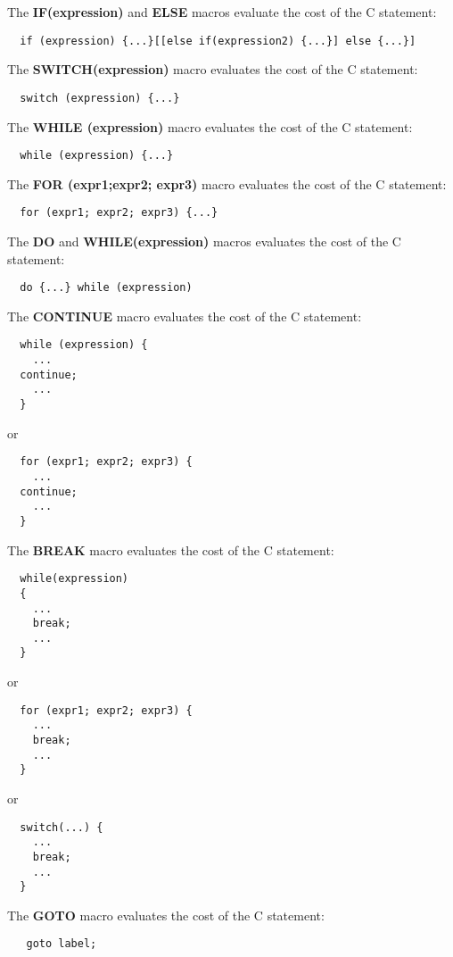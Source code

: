 \begin{list}{o}{}
\item The \textbf{IF(expression)} and \textbf{ELSE} macros
evaluate the cost of the C statement:
{\small
\begin{verbatim}
  if (expression) {...}[[else if(expression2) {...}] else {...}]
\end{verbatim}}
\item The \textbf{SWITCH(expression)} macro evaluates the cost of the C
statement:
{\small
\begin{verbatim}
  switch (expression) {...}
\end{verbatim}}
\item The \textbf{WHILE (expression)} macro evaluates the cost of the C
statement: 
{\small
\begin{verbatim}
  while (expression) {...}
\end{verbatim}}
\item The \textbf{FOR (expr1;expr2; expr3)} macro evaluates the cost
  of the C statement:
{\small
\begin{verbatim}
  for (expr1; expr2; expr3) {...}
\end{verbatim}}
\item The \textbf{DO} and \textbf{WHILE(expression)} macros evaluates 
      the cost of the C statement:
{\small
\begin{verbatim}
  do {...} while (expression)
\end{verbatim}}
\item The \textbf{CONTINUE} macro evaluates the cost of the C statement:\\
{\small
\begin{verbatim}
  while (expression) {
    ...
  continue;
    ...
  }
\end{verbatim}}
or 
{\small
\begin{verbatim}
  for (expr1; expr2; expr3) {
    ...
  continue;
    ...
  }
\end{verbatim}}
\item The \textbf{BREAK} macro evaluates the cost of the C statement: 
{\small
\begin{verbatim}
  while(expression)
  {
    ...
    break;
    ...
  }
\end{verbatim}}
or
{\small
\begin{verbatim}
  for (expr1; expr2; expr3) {
    ...
    break;
    ...
  }
\end{verbatim}}
or
{\small
\begin{verbatim}
  switch(...) {
    ...
    break;
    ...
  }
\end{verbatim}}
\item The \textbf{GOTO} macro evaluates the cost of the C statement:
{\small
\begin{verbatim}
   goto label;
\end{verbatim}}
\end{list}

